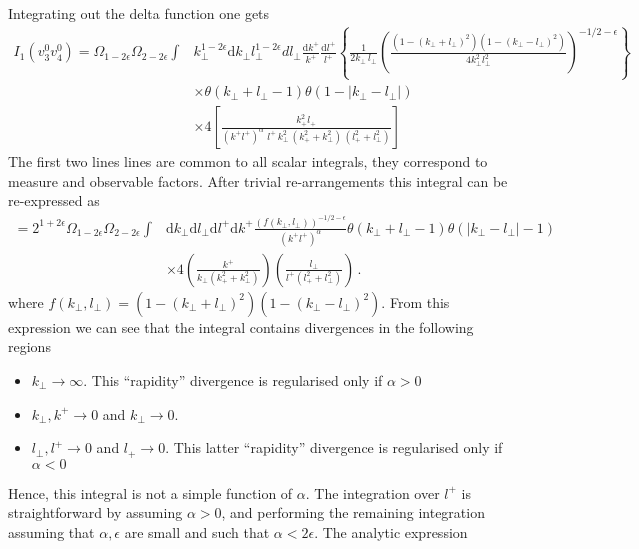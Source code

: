 \documentclass[a4paper,11pt]{article}
\numberwithin{equation}{section}
\newcommand{\dd}{\text{d}}
\begin{document}
Integrating out the delta function one gets 
\begin{align}
I_1 (v_3^0 v_4^0) = \Omega_{1-2\epsilon} \Omega_{2-2\epsilon} 
\int&  k_\perp^{1-2\epsilon} \dd k_\perp l_\perp^{1-2\epsilon} 
	    d l_\perp \frac{\dd k^+}{k^+} \frac{\dd l^+}{l^+}	     
	    \left\{
            \frac{1}{2k_\perp\, l_\perp}
            \left( 
            \frac{(1-(k_\perp+l_\perp)^2)(1-(k_\perp-l_\perp)^2)}{4k_\perp^2l_\perp^2}
            \right)^{-1/2-\epsilon}
            \right\} 
            \nonumber\\
            &\times \theta(k_\perp+l_\perp-1) \theta(1-|k_\perp-l_\perp|)
            \nonumber\\            
            &\times 4 \left[ \frac{ k_+^2l_+ }{ (k^+ l^+)^\alpha\, \, l^+\,  k_\perp^2
            \, (k_+^2 +k_\perp^2) \, (l_+^2 +l_\perp^2)   }\right]
 \end{align}
 The first two lines lines are common to all scalar integrals, they correspond to measure and observable factors.   
 After trivial re-arrangements this integral can be re-expressed as
\begin{align}            
            = 2^{1+2\epsilon} \Omega_{1-2\epsilon} \Omega_{2-2\epsilon} 
	    \int&  \dd k_\perp  \dd l_\perp \dd l^+ \dd k^+
	     \frac{\left( f(k_\perp, l_\perp)\right)^{-1/2-\epsilon}}
	    {(k^+ l^+)^\alpha}  \theta(k_\perp+l_\perp-1) \theta(|k_\perp-l_\perp|-1)
	    \nonumber\\
	    &\times 4 \left(\frac{k^+ }{k_\perp(k_+^2 +k_\perp^2) } \right)     
	    \left( \frac{l_\perp}{  l^+(l_+^2 +l_\perp^2)}\right) \,.
\end{align}
where $f(k_\perp, l_\perp)=  (1-(k_\perp+l_\perp)^2)(1-(k_\perp-l_\perp)^2)$. From this expression we can see that the integral contains divergences in the following regions 
\begin{itemize}
\item  $k_\perp\to \infty $. This ``rapidity'' divergence is regularised only if $\alpha>0$
\item  $k_\perp,k^+\to 0 $ and $k_\perp\to 0$.
\item  $l_\perp,l^+\to 0$ and $l_+\to0$. This latter
``rapidity'' divergence is regularised only if $\alpha<0$
\end{itemize}
Hence, this integral is not a simple function of $\alpha$. The integration over $l^+$ is straightforward by assuming $\alpha>0$, and performing the remaining integration assuming that $\alpha,\epsilon$ are small and such that $\alpha<2\epsilon$. The analytic expression 
\end{document}
